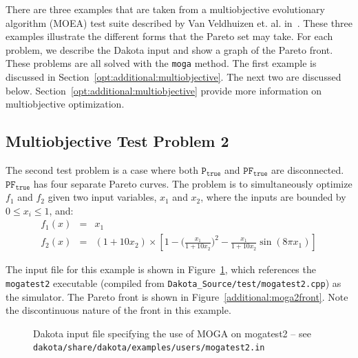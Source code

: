 There are three examples that are taken from a multiobjective
evolutionary algorithm (MOEA) test suite described by Van Veldhuizen
et. al. in~\cite{Coe02}. These three examples illustrate the different
forms that the Pareto set may take. For each problem, we describe the
Dakota input and show a graph of the Pareto front. These problems are
all solved with the \texttt{moga} method.  The first example is
discussed in Section~\ref{opt:additional:multiobjective}.  The next
two are discussed below.  Section~\ref{opt:additional:multiobjective}
provide more information on multiobjective optimization.

\subsection{Multiobjective Test Problem 2}\label{additional:multiobjective:problem2}

The second test problem is a case where both $\mathtt{P_{true}}$ and
$\mathtt{PF_{true}}$ are disconnected. $\mathtt{PF_{true}}$ has four
separate Pareto curves. The problem is to simultaneously optimize
$f_1$ and $f_2$ given two input variables, $x_1$ and $x_2$,
where the inputs are bounded by $0 \leq x_{i} \leq 1$, and:
\begin{eqnarray*}
f_1(x) &=& x_1 \\
f_2(x) &=& (1+10x_2) \times \left[1-\bigg(\frac{x_1}{1+10x_2}\bigg)^2-
\frac{x_1}{1+10x_2}\sin(8\pi x_1)\right]
\end{eqnarray*}

The input file for this example is shown in
Figure~\ref{additional:moga2inp}, which references the
\texttt{mogatest2} executable (compiled from
\texttt{Dakota\_Source/test/mogatest2.cpp}) as the simulator. The Pareto
front is shown in Figure~\ref{additional:moga2front}. Note the
discontinuous nature of the front in this example.

\begin{figure}
  \centering
  \begin{bigbox}
    \begin{small}
    \end{small}
  \end{bigbox}
  \caption{Dakota input file specifying the use of MOGA on mogatest2 --
see \texttt{dakota/share/dakota/examples/users/mogatest2.in} }
  \label{additional:moga2inp}
\end{figure}

